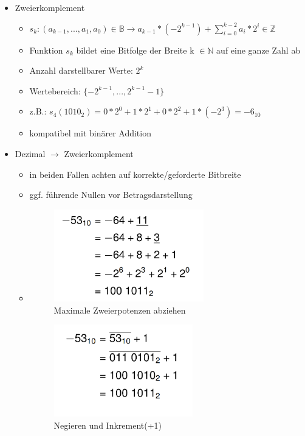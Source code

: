 \documentclass[11pt,a4paper]{article}
\begin{document}
\begin{itemize}
\begin{itemize}
	\item Zweierkomplement
		\begin{itemize}
		\item $s_k:(a_{k-1},...,a_1,a_0) \in \mathbb{B} \rightarrow a_{k-1} * (-2^{k-1}) + \sum^{k-2}_{i=0} a_i * 2^i \in \mathbb{Z}$
		\item Funktion $s_k$ bildet eine Bitfolge der Breite k $\in \mathbb{N}$ auf eine ganze Zahl ab
		\item Anzahl darstellbarer Werte: $2^k$
		\item Wertebereich: $\{-2^{k-1},...,2^{k-1}-1\}$
		\item z.B.: $s_4(1010_2) = 0*2^0+1*2^1+0*2^2+1*(-2^3)=-6_{10}$
		\item kompatibel mit binärer Addition
		\end{itemize}			
	
	\item Dezimal $\rightarrow$ Zweierkomplement
		\begin{itemize}
		\item in beiden Fallen achten auf korrekte/geforderte Bitbreite 
		\item ggf. führende Nullen vor Betragsdarstellung
		\item[]
			\begin{minipage}{0.4\textwidth}
				\begin{figure}[H]
				\includegraphics[height=4cm]{Bilder/dtoz1}
				\caption{Maximale Zweierpotenzen abziehen}
				\end{figure}
			\end{minipage}
			\begin{minipage}[t]{0.45\textwidth}
				\begin{figure}[H]
				\vspace{-3cm}
				\includegraphics[height=4cm]{Bilder/dtoz2}
				\caption{Negieren und Inkrement(+1)}
				\end{figure}
			\end{minipage}
		

\end{itemize}
\end{itemize}
\end{itemize}
\end{document}
